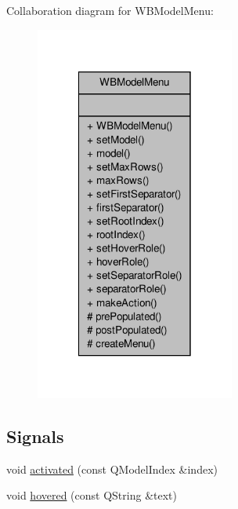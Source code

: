 Collaboration diagram for W\-B\-Model\-Menu\-:
\nopagebreak
\begin{figure}[H]
\begin{center}
\leavevmode
\includegraphics[width=186pt]{d6/dea/class_w_b_model_menu__coll__graph}
\end{center}
\end{figure}
\subsection*{Signals}
\begin{DoxyCompactItemize}
\item 
void \hyperlink{class_w_b_model_menu_a55dc076590a6705ecb8730b91650f1fd}{activated} (const Q\-Model\-Index \&index)
\item 
void \hyperlink{class_w_b_model_menu_ac3383d3a239583b3963ecc967d2db62a}{hovered} (const Q\-String \&text)
\end{DoxyCompactItemize}
